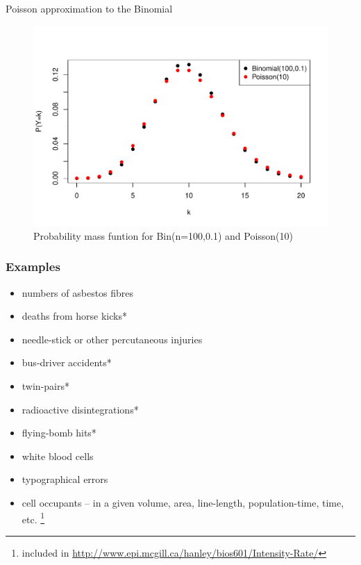 \documentclass[10pt]{beamer}\usepackage[]{graphicx}\usepackage[]{color}
\makeatletter
\def\maxwidth{ %
  \ifdim\Gin@nat@width>\linewidth
    \linewidth
  \else
    \Gin@nat@width
  \fi
}
\newenvironment{knitrout}{}{} %
\makeatother
\begin{document}
\begin{frame}{Poisson approximation to the Binomial}
	
	
\begin{knitrout}\tiny
{}\color{fgcolor}\begin{figure}

{\centering \includegraphics[width=\maxwidth]{figure/unnamed-chunk-13-1} 

}

\caption[Probability mass funtion for Bin(n=100,0.1) and Poisson(10)]{Probability mass funtion for Bin(n=100,0.1) and Poisson(10)}\label{fig:unnamed-chunk-13}
\end{figure}

\end{knitrout}
	
\end{frame}


\begin{frame}
	\frametitle{Examples}
	
	\begin{itemize}
		\setlength\itemsep{0.5em}
		\item numbers of asbestos fibres
		\item deaths from horse kicks*
		\item needle-stick or other percutaneous injuries
		\item bus-driver accidents*
		\item twin-pairs*
		\item radioactive disintegrations*
		\item flying-bomb hits*
		\item white blood cells
		\item typographical errors
		\item cell occupants -- in a given volume, area, line-length, population-time, time, etc. 
		\footnote{\footnotesize * included in \url{http://www.epi.mcgill.ca/hanley/bios601/Intensity-Rate/}}
	\end{itemize}
\end{frame}
\end{document}

